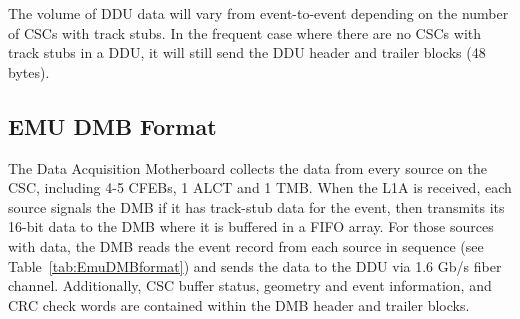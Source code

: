 The volume of DDU data will vary from event-to-event depending on the number
of CSCs with track stubs.  In the frequent case where there are no CSCs
with track stubs in a DDU, it will still send the DDU header and trailer
blocks (48 bytes).



\subsection{EMU DMB Format}
The Data Acquisition Motherboard
collects the data from every source on the CSC, including 4-5 CFEBs,
1 ALCT and 1 TMB.  When the L1A is received, each source signals %
the DMB if it has track-stub data for the event, then transmits
its 16-bit data to the DMB where it is buffered in a FIFO array.  
For those sources with data,
the DMB reads the event record from each source in sequence
(see Table~\ref{tab:EmuDMBformat}) and sends the data
to the DDU via 1.6 Gb/s fiber channel.
Additionally, %
CSC buffer status, geometry and event information,
and CRC check words are contained
within the DMB header and trailer blocks.
